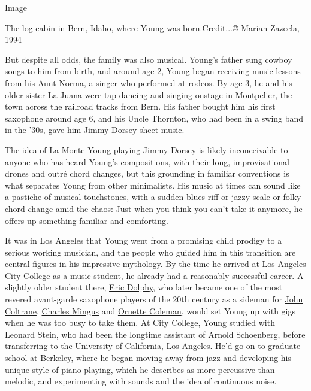 Image

The log cabin in Bern, Idaho, where Young was born.Credit...© Marian
Zazeela, 1994

But despite all odds, the family was also musical. Young's father sung
cowboy songs to him from birth, and around age 2, Young began receiving
music lessons from his Aunt Norma, a singer who performed at rodeos. By
age 3, he and his older sister La Juana were tap dancing and singing
onstage in Montpelier, the town across the railroad tracks from Bern.
His father bought him his first saxophone around age 6, and his Uncle
Thornton, who had been in a swing band in the '30s, gave him Jimmy
Dorsey sheet music.

The idea of La Monte Young playing Jimmy Dorsey is likely inconceivable
to anyone who has heard Young's compositions, with their long,
improvisational drones and outré chord changes, but this grounding in
familiar conventions is what separates Young from other minimalists. His
music at times can sound like a pastiche of musical touchstones, with a
sudden blues riff or jazzy scale or folky chord change amid the chaos:
Just when you think you can't take it anymore, he offers up something
familiar and comforting.

It was in Los Angeles that Young went from a promising child prodigy to
a serious working musician, and the people who guided him in this
transition are central figures in his impressive mythology. By the time
he arrived at Los Angeles City College as a music student, he already
had a reasonably successful career. A slightly older student there,
\href{https://www.nytimes.com/2014/05/28/arts/music/a-new-focus-on-eric-dolphy-in-washington-and-montclair.html}{Eric
Dolphy}, who later became one of the most revered avant-garde saxophone
players of the 20th century as a sideman for
\href{https://www.nytimes.com/topic/person/john-coltrane}{John
Coltrane},
\href{https://www.nytimes.com/1979/01/09/archives/charles-mingus-56-bass-player-bandleader-and-composer-dead-an.html}{Charles
Mingus} and
\href{https://www.nytimes.com/2015/06/12/arts/music/ornette-coleman-jazz-saxophonist-dies-at-85-obituary.html}{Ornette
Coleman}, would set Young up with gigs when he was too busy to take
them. At City College, Young studied with Leonard Stein, who had been
the longtime assistant of Arnold Schoenberg, before transferring to the
University of California, Los Angeles. He'd go on to graduate school at
Berkeley, where he began moving away from jazz and developing his unique
style of piano playing, which he describes as more percussive than
melodic, and experimenting with sounds and the idea of continuous noise.

